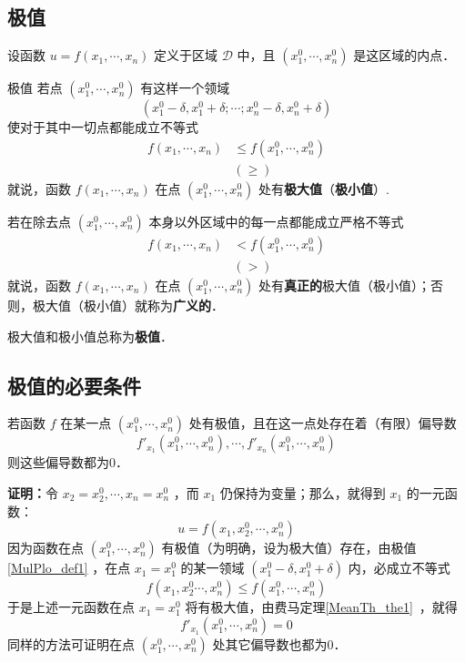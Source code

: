 

\subsection{极值}
设函数 $u=f(x_1,\cdots,x_n)$ 定义于区域 $\mathcal{D}$ 中，且 $(x_1^0,\cdots,x_n^0)$ 是这区域的内点．

\begin{definition}{极值}\label{MulPlo_def1}
若点 $(x_1^0,\cdots,x_n^0)$ 有这样一个领域
\[(x_1^0-\delta,x_1^0+\delta;\cdots;x_n^0-\delta,x_n^0+\delta)\]
使对于其中一切点都能成立不等式
\begin{equation}
\begin{aligned}
f(x_1,\cdots,x_n)&\leq f(x_1^0,\cdots,x_n^0)\\
&(\geq)
\end{aligned}
\end{equation}
就说，函数 $f(x_1,\cdots,x_n)$ 在点 $(x_1^0,\cdots,x_n^0)$ 处有\textbf{极大值}（\textbf{极小值}）.

若在除去点 $(x_1^0,\cdots,x_n^0)$ 本身以外区域中的每一点都能成立严格不等式
\begin{equation}
\begin{aligned}
f(x_1,\cdots,x_n)&< f(x_1^0,\cdots,x_n^0)\\
&(>)
\end{aligned}
\end{equation}
就说，函数 $f(x_1,\cdots,x_n)$ 在点 $(x_1^0,\cdots,x_n^0)$ 处有\textbf{真正的}极大值（极小值）；否则，极大值（极小值）就称为\textbf{广义的}．

极大值和极小值总称为\textbf{极值}．
\end{definition}
\subsection{极值的必要条件}
\begin{theorem}{}
若函数 $f$ 在某一点 $(x_1^0,\cdots,x_n^0)$ 处有极值，且在这一点处存在着（有限）偏导数
\[f'_{x_1}(x_1^0,\cdots,x_n^0),\cdots,f'_{x_n}(x_1^0,\cdots,x_n^0)\]
则这些偏导数都为0．
\end{theorem}
\textbf{证明：}令 $x_2=x_2^0,\cdots,x_n=x_n^0$ ，而 $x_1$ 仍保持为变量；那么，就得到 $x_1$ 的一元函数：
\begin{equation}
u=f(x_1,x_2^0,\cdots,x_n^0)
\end{equation}
因为函数在点 $(x_1^0,\cdots,x_n^0)$ 有极值（为明确，设为极大值）存在，由极值\autoref{MulPlo_def1} ，在点 $x_1=x_1^0$ 的某一领域 $(x_1^0-\delta,x_1^0+\delta)$ 内，必成立不等式
\begin{equation}
f(x_1,x_2^0\cdots,x_n^0)\leq f(x_1^0,\cdots,x_n^0)
\end{equation}
于是上述一元函数在点 $x_1=x_1^0$ 将有极大值，由费马定理\autoref{MeanTh_the1}~，就得
\begin{equation}
f'_{x_1}(x_1^0,\cdots,x_n^0)=0
\end{equation}
同样的方法可证明在点 $(x_1^0,\cdots,x_n^0)$ 处其它偏导数也都为0．

